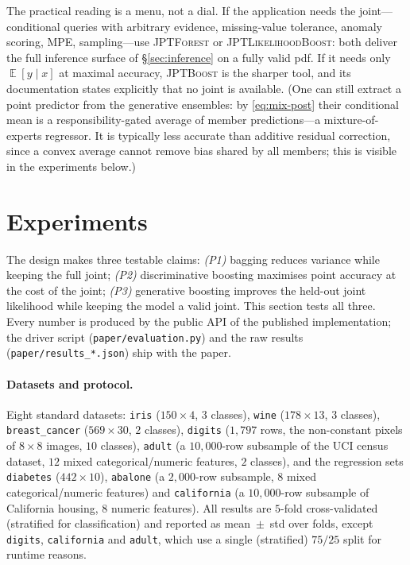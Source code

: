 \documentclass[11pt]{article}
\theoremstyle{plain}
\theoremstyle{definition}
\theoremstyle{remark}
\DeclareMathOperator{\E}{\mathbb{E}}
\newcommand{\jptforest}{\textsc{JPTForest}}
\newcommand{\likeboost}{\textsc{JPTLikelihoodBoost}}
\newcommand{\jptboost}{\textsc{JPTBoost}}
\begin{document}
The practical reading is a menu, not a dial. If the application needs the
joint---conditional queries with arbitrary evidence, missing-value
tolerance, anomaly scoring, MPE, sampling---use \jptforest{} or
\likeboost{}: both deliver the full inference surface of
\S\ref{sec:inference} on a fully valid pdf. If it needs only
$\E[y\mid x]$ at maximal accuracy, \jptboost{} is the sharper tool, and
its documentation states explicitly that no joint is available. (One can
still extract a point predictor from the generative ensembles: by
\eqref{eq:mix-post} their conditional mean is a responsibility-gated
average of member predictions---a mixture-of-experts regressor. It is
typically less accurate than additive residual correction, since a convex
average cannot remove bias shared by all members; this is visible in the
experiments below.)

\section{Experiments}
\label{sec:experiments}

The design makes three testable claims: \emph{(P1)} bagging reduces
variance while keeping the full joint; \emph{(P2)} discriminative
boosting maximises point accuracy at the cost of the joint; \emph{(P3)}
generative boosting improves the held-out joint likelihood while keeping
the model a valid joint. This section tests all three. Every number is
produced by the public API of the published implementation; the driver
script (\texttt{paper/evaluation.py}) and the raw results
(\texttt{paper/results\_*.json}) ship with the paper.

\paragraph{Datasets and protocol.} Eight standard datasets:
\texttt{iris} ($150\times4$, $3$ classes), \texttt{wine}
($178\times13$, $3$ classes), \texttt{breast\_cancer} ($569\times30$,
$2$ classes), \texttt{digits} ($1{,}797$ rows, the non-constant
pixels of $8\times8$ images, $10$ classes), \texttt{adult}
(a $10{,}000$-row subsample of the UCI census dataset, $12$ mixed
categorical/numeric features, $2$ classes), and the regression sets
\texttt{diabetes} ($442\times10$), \texttt{abalone} (a $2{,}000$-row
subsample, $8$ mixed categorical/numeric features) and
\texttt{california} (a $10{,}000$-row subsample of California housing,
$8$ numeric features). All results are $5$-fold cross-validated
(stratified for classification) and reported as mean~$\pm$~std over
folds, except \texttt{digits}, \texttt{california} and \texttt{adult},
which use a single (stratified) $75/25$ split for runtime reasons.
\end{document}

